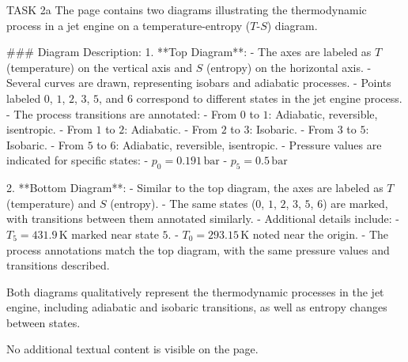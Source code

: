 TASK 2a  
The page contains two diagrams illustrating the thermodynamic process in a jet engine on a temperature-entropy (\(T\)-\(S\)) diagram.  

### Diagram Description:  
1. **Top Diagram**:  
   - The axes are labeled as \(T\) (temperature) on the vertical axis and \(S\) (entropy) on the horizontal axis.  
   - Several curves are drawn, representing isobars and adiabatic processes.  
   - Points labeled \(0\), \(1\), \(2\), \(3\), \(5\), and \(6\) correspond to different states in the jet engine process.  
   - The process transitions are annotated:  
     - From \(0\) to \(1\): Adiabatic, reversible, isentropic.  
     - From \(1\) to \(2\): Adiabatic.  
     - From \(2\) to \(3\): Isobaric.  
     - From \(3\) to \(5\): Isobaric.  
     - From \(5\) to \(6\): Adiabatic, reversible, isentropic.  
   - Pressure values are indicated for specific states:  
     - \(p_0 = 0.191 \, \text{bar}\)  
     - \(p_5 = 0.5 \, \text{bar}\)  

2. **Bottom Diagram**:  
   - Similar to the top diagram, the axes are labeled as \(T\) (temperature) and \(S\) (entropy).  
   - The same states (\(0\), \(1\), \(2\), \(3\), \(5\), \(6\)) are marked, with transitions between them annotated similarly.  
   - Additional details include:  
     - \(T_5 = 431.9 \, \text{K}\) marked near state \(5\).  
     - \(T_0 = 293.15 \, \text{K}\) noted near the origin.  
   - The process annotations match the top diagram, with the same pressure values and transitions described.  

Both diagrams qualitatively represent the thermodynamic processes in the jet engine, including adiabatic and isobaric transitions, as well as entropy changes between states.  

No additional textual content is visible on the page.